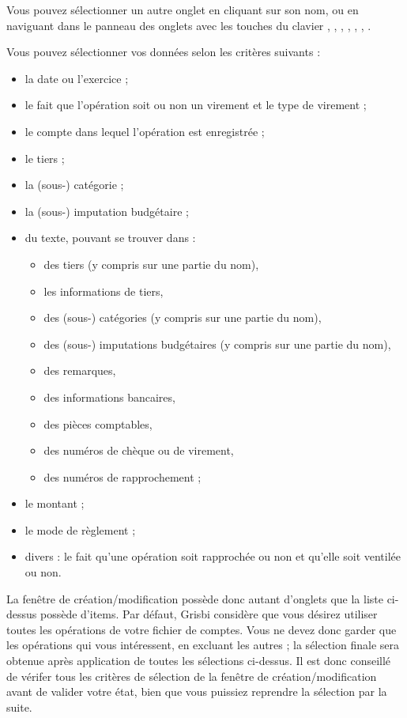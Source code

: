 Vous pouvez sélectionner un autre onglet en cliquant sur son nom, ou en naviguant dans le panneau des onglets avec les touches du clavier ,  , , , , , .
 
Vous pouvez sélectionner vos données selon les critères suivants :

\begin{itemize}
	\item la date ou l'exercice ;
	\item le fait que l'opération soit ou non un virement et le type
	de virement ;
	\item le compte dans lequel l'opération est enregistrée ;
	\item le tiers ;
	\item la (sous-) catégorie ;
	\item la (sous-) imputation budgétaire ;
	\item du texte, pouvant se trouver dans :
		\begin{itemize}
			  \item des tiers (y compris sur une partie du nom),
			  \item les informations de tiers,
			  \item des (sous-) catégories (y compris sur une partie du nom),
			  \item des (sous-) imputations budgétaires (y compris sur une partie du nom),
			  \item des remarques,
			  \item des informations bancaires,
			  \item des pièces comptables,
			  \item des numéros de chèque ou de virement,
			  \item des numéros de rapprochement ;
		\end{itemize} 
	\item le montant ;
	\item le mode de règlement ;
	\item divers : le fait qu'une opération soit rapprochée ou non et qu'elle soit ventilée ou non.
\end{itemize}

La fenêtre de création/modification possède donc autant d'onglets que la liste ci-dessus possède d'items. Par défaut, Grisbi considère que vous désirez utiliser toutes les opérations de votre fichier de comptes. Vous ne devez donc garder que les opérations qui vous intéressent, en excluant les autres ; la sélection finale sera obtenue après application de toutes les sélections ci-dessus. Il est donc conseillé de vérifer tous les critères de sélection de la fenêtre de création/modification avant de valider votre état, bien que vous puissiez reprendre la sélection par la suite.

